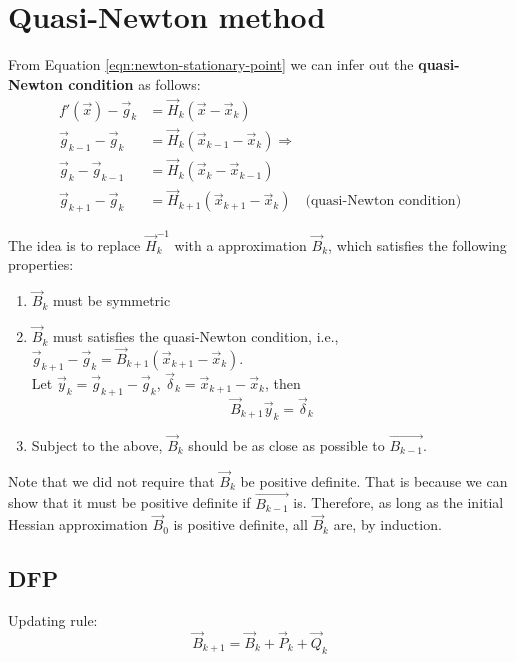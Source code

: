 \section{Quasi-Newton method}
\label{sec:Quasi-Newton-method}
From Equation \eqref{eqn:newton-stationary-point} we can infer out the \textbf{quasi-Newton condition} as follows:
\begin{align}
f'(\vec{x})-\vec{g}_k & = \vec{H}_k(\vec{x}-\vec{x}_k) \nonumber \\
\vec{g}_{k-1}-\vec{g}_k & = \vec{H}_k(\vec{x}_{k-1}-\vec{x}_k) \Rightarrow \nonumber \\
\vec{g}_k- \vec{g}_{k-1} & = \vec{H}_k(\vec{x}_k-\vec{x}_{k-1}) \nonumber \\
\vec{g}_{k+1}- \vec{g}_k & = \vec{H}_{k+1}(\vec{x}_{k+1}-\vec{x}_k) \quad \text{(quasi-Newton condition)} \label{eqn:quasi-Newton-condition}
\end{align}

The idea is to replace $\vec{H}_k^{-1}$ with a approximation $\vec{B}_k$, which satisfies the following properties:
\begin{enumerate}
\item{$\vec{B}_k$ must be symmetric}
\item{$\vec{B}_k$ must satisfies the quasi-Newton condition, i.e., $\vec{g}_{k+1} - \vec{g}_k= \vec{B}_{k+1}(\vec{x}_{k+1}-\vec{x}_k)$. \\
Let $\vec{y}_k=\vec{g}_{k+1}- \vec{g}_k$, $\vec{\delta}_k=\vec{x}_{k+1}-\vec{x}_k$, then
\begin{equation}
\vec{B}_{k+1}\vec{y}_k=\vec{\delta}_k \label{eqn:secant-equation}
\end{equation}
}
\item{Subject to the above, $\vec{B}_k$ should be as close as possible to $\vec{B_{k-1}}$.}
\end{enumerate}

Note that we did not require that $\vec{B}_k$ be positive definite. That is because we can show that it must be 
positive definite if $\vec{B_{k-1}}$ is. Therefore, as long as the initial Hessian approximation $\vec{B}_0$ is positive definite, 
all $\vec{B}_k$ are, by induction. 


\subsection{DFP}
Updating rule:
\begin{equation}
\vec{B}_{k+1}=\vec{B}_k+\vec{P}_k+\vec{Q}_k
\end{equation}


